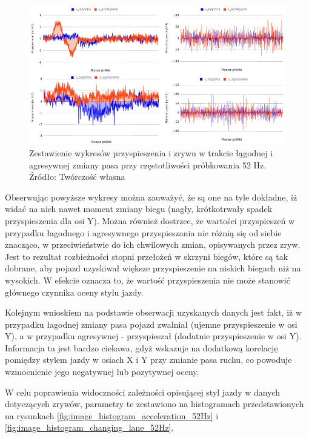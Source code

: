 \begin{figure}[H]
	\centering
	\includegraphics[width=16cm]{img/driving_analysis/zestawienie_ostra_lagodna.png}
	\caption{Zestawienie wykresów przyspieszenia i zrywu w trakcie łągodnej i agresywnej zmiany pasa przy częstotliwości próbkowania 52 Hz.
	\\Źródło: Twórczość własna}
	\label{fig:image_driving_analysis_test_acc_light_hard_lane_52Hz}
\end{figure}

Obserwując powyższe wykresy można zauważyć, że są one na tyle dokładne, iż widać na nich nawet moment zmiany biegu (nagły, krótkotrwały spadek przyspieszenia dla osi Y). Można również dostrzec, że wartości przyspieszeń w przypadku łagodnego i agresywnego przyspieszania nie różnią się od siebie znacząco, w przeciwieństwie do ich chwilowych zmian, opisywanych przez zryw. Jest to rezultat rozbieżności stopni przełożeń w skrzyni biegów, które są tak dobrane, aby pojazd uzyskiwał większe przyspieszenie na niskich biegach niż na wysokich. W efekcie oznacza to, że wartość przyspieszenia nie może stanowić głównego czynnika oceny stylu jazdy.

Kolejnym wnioskiem na podstawie obserwacji uzyskanych danych jest fakt, iż w przypadku łagodnej zmiany pasa pojazd zwalniał (ujemne przyspieszenie w osi Y), a w przypadku agresywnej - przyspieszał (dodatnie przyspieszenie w osi Y). Informacja ta jest bardzo ciekawa, gdyż wskazuje na dodatkową korelację pomiędzy stylem jazdy w osiach X i Y przy zmianie pasa ruchu, co powoduje wzmocnienie jego negatywnej lub pozytywnej oceny.

W celu poprawienia widoczności zależności opisującej styl jazdy w danych dotyczących zrywów, parametry te zestawiono na histogramach przedstawionych na rysunkach \ref{fig:image_histogram_acceleration_52Hz} i \ref{fig:image_histogram_changing_lane_52Hz}.

